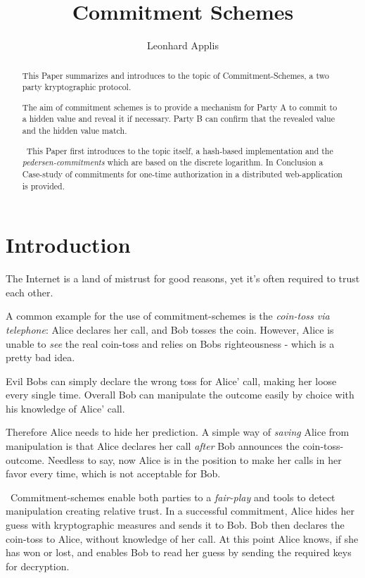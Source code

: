 \documentclass[conference]{IEEEtran}
\begin{document}
\title{Commitment Schemes}
\author{Leonhard Applis}

\maketitle

\begin{abstract}
This Paper summarizes and  introduces to  the topic of Commitment-Schemes, a two party kryptographic protocol. 

The aim of commitment schemes is to provide a mechanism for Party A to commit to a hidden value and reveal it if necessary. Party B can confirm that the revealed value and the hidden value match.

~\newline This Paper first introduces to the topic itself, a hash-based implementation and the \textit{pedersen-commitments} which are based on the discrete logarithm. In Conclusion a Case-study of commitments for one-time authorization in a distributed web-application is provided. 
\end{abstract}

\section{Introduction}
The Internet is a land of mistrust for good reasons, yet it's often required to trust each other. 

A common example for the use of commitment-schemes is the \textit{coin-toss via telephone}: Alice declares her call, and Bob tosses the coin. However, Alice is unable to \textit{see} the real coin-toss and relies on Bobs righteousness - which is a pretty bad idea. 

Evil Bobs can simply declare the wrong toss for Alice' call, making her loose every single time. Overall Bob can manipulate the outcome easily by choice with his knowledge of Alice' call. 

Therefore Alice needs to hide her prediction. A simple way of \textit{saving} Alice from manipulation is that Alice declares her call \textit{after} Bob announces the coin-toss-outcome. Needless to say, now Alice is in the position to make her calls in her favor every time, which is not acceptable for Bob. 

~\newline Commitment-schemes enable both parties to a \textit{fair-play} and tools to detect manipulation creating relative trust. In a successful commitment, Alice hides her guess with kryptographic measures and sends it to Bob. Bob then declares the coin-toss to Alice, without knowledge of her call. At this point Alice knows, if she has won or lost, and enables Bob to read her guess by sending the required keys for decryption.
\end{document}
